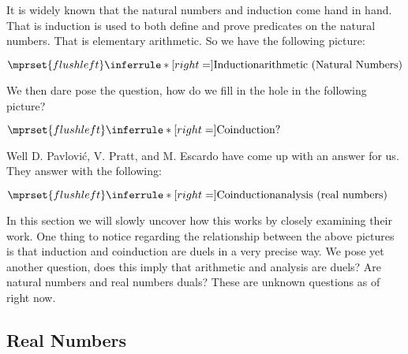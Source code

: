 It is widely known that the natural numbers and induction come hand in hand.  That is induction is used to both define and prove
predicates on the natural numbers.  That is elementary arithmetic. So we have the following picture:
\begin{center}
  \begin{math}
    $$\mprset{flushleft}
    \inferrule* [right=] {
      \text{Induction}
    }{\text{arithmetic (Natural Numbers)}}
  \end{math}
\end{center}
We then dare pose the question, how do we fill in the hole in the following picture?
\begin{center}
  \begin{math}
    $$\mprset{flushleft}
    \inferrule* [right=] {
      \text{Coinduction}
    }{\text{?}}
  \end{math}
\end{center}
Well D. Pavlovi\'{c}, V. Pratt, and M. Escardo have come up with an answer for us.  They answer with the following:
\begin{center}
  \begin{math}
    $$\mprset{flushleft}
    \inferrule* [right=] {
      \text{Coinduction}
    }{\text{analysis (real numbers)}}
  \end{math}
\end{center}
In this section we will slowly uncover how this works by closely examining their work.  One thing to notice regarding the 
relationship between the above pictures is that induction and coinduction are duels in a very precise way.  We pose yet another
question, does this imply that arithmetic and analysis are duels?  Are natural numbers and real numbers duals?  These are unknown
questions as of right now.

\subsection{Real Numbers}
\label{subsec:real_numbers}

